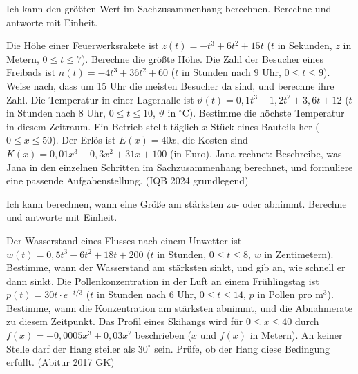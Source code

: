 \begin{aufgabe}{Ich kann den größten Wert im Sachzusammenhang berechnen.}
Berechne und antworte mit Einheit.
\begin{teile}
\teil Die Höhe einer Feuerwerksrakete ist $z(t) = -t^3 + 6t^2 + 15t$ ($t$ in Sekunden, $z$ in Metern, $0 \le t \le 7$). Berechne die größte Höhe.
\teil Die Zahl der Besucher eines Freibads ist $n(t) = -4t^3 + 36t^2 + 60$ ($t$ in Stunden nach 9 Uhr, $0 \le t \le 9$). Weise nach, dass um 15 Uhr die meisten Besucher da sind, und berechne ihre Zahl.
\teil Die Temperatur in einer Lagerhalle ist $\vartheta(t) = 0{,}1t^3 - 1{,}2t^2 + 3{,}6t + 12$ ($t$ in Stunden nach 8 Uhr, $0 \le t \le 10$, $\vartheta$ in $^\circ$C). Bestimme die höchste Temperatur in diesem Zeitraum.
\teil Ein Betrieb stellt täglich $x$ Stück eines Bauteils her ($0 \le x \le 50$). Der Erlös ist $E(x) = 40x$, die Kosten sind $K(x) = 0{,}01x^3 - 0{,}3x^2 + 31x + 100$ (in Euro). Jana rechnet:
Beschreibe, was Jana in den einzelnen Schritten im Sachzusammenhang berechnet, und formuliere eine passende Aufgabenstellung. (IQB 2024 grundlegend)
\end{teile}
\end{aufgabe}

\begin{aufgabe}{Ich kann berechnen, wann eine Größe am stärksten zu- oder abnimmt.}
Berechne und antworte mit Einheit.
\begin{teile}
\teil Der Wasserstand eines Flusses nach einem Unwetter ist $w(t) = 0{,}5t^3 - 6t^2 + 18t + 200$ ($t$ in Stunden, $0 \le t \le 8$, $w$ in Zentimetern). Bestimme, wann der Wasserstand am stärksten sinkt, und gib an, wie schnell er dann sinkt.
\teil Die Pollenkonzentration in der Luft an einem Frühlingstag ist $p(t) = 30t\cdot e^{-t/3}$ ($t$ in Stunden nach 6 Uhr, $0 \le t \le 14$, $p$ in Pollen pro m$^3$). Bestimme, wann die Konzentration am stärksten abnimmt, und die Abnahmerate zu diesem Zeitpunkt.
\teil Das Profil eines Skihangs wird für $0 \le x \le 40$ durch $f(x) = -0{,}0005x^3 + 0{,}03x^2$ beschrieben ($x$ und $f(x)$ in Metern). An keiner Stelle darf der Hang steiler als $30^\circ$ sein. Prüfe, ob der Hang diese Bedingung erfüllt. (Abitur 2017 GK)
\end{teile}
\end{aufgabe}

